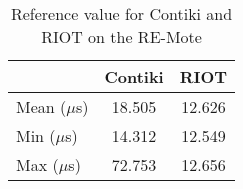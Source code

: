 \begin{table}[!ht]
  \centering
  \begin{tabular}{l|c|c}
       & Contiki & RIOT \\ \hline
  Mean ($\mu$s) & 18.505 & 12.626 \\
  Min  ($\mu$s) & 14.312 & 12.549 \\
  Max  ($\mu$s) & 72.753   & 12.656
  \end{tabular}
  \caption{Reference value for Contiki and RIOT on the RE-Mote}
  \label{tab:reference-value-remote}
  \end{table}